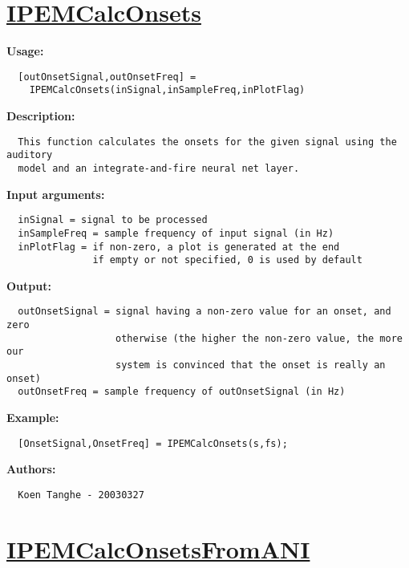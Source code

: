 \newpage
\section*{\hyperlink{Concepts:IPEMCalcOnsets}{IPEMCalcOnsets}}
\hypertarget{FuncRef:IPEMCalcOnsets}{}

\textbf{Usage:}
\begin{verbatim}  [outOnsetSignal,outOnsetFreq] = 
    IPEMCalcOnsets(inSignal,inSampleFreq,inPlotFlag)

\end{verbatim}
\textbf{Description:}
\begin{verbatim}  This function calculates the onsets for the given signal using the auditory
  model and an integrate-and-fire neural net layer.

\end{verbatim}
\textbf{Input arguments:}
\begin{verbatim}  inSignal = signal to be processed
  inSampleFreq = sample frequency of input signal (in Hz)
  inPlotFlag = if non-zero, a plot is generated at the end
               if empty or not specified, 0 is used by default

\end{verbatim}
\textbf{Output:}
\begin{verbatim}  outOnsetSignal = signal having a non-zero value for an onset, and zero
                   otherwise (the higher the non-zero value, the more our
                   system is convinced that the onset is really an onset)
  outOnsetFreq = sample frequency of outOnsetSignal (in Hz)

\end{verbatim}
\textbf{Example:}
\begin{verbatim}  [OnsetSignal,OnsetFreq] = IPEMCalcOnsets(s,fs);

\end{verbatim}
\textbf{Authors:}
\begin{verbatim}  Koen Tanghe - 20030327
\end{verbatim}


\newpage
\section*{\hyperlink{Concepts:IPEMCalcOnsetsFromANI}{IPEMCalcOnsetsFromANI}}
\hypertarget{FuncRef:IPEMCalcOnsetsFromANI}{}

